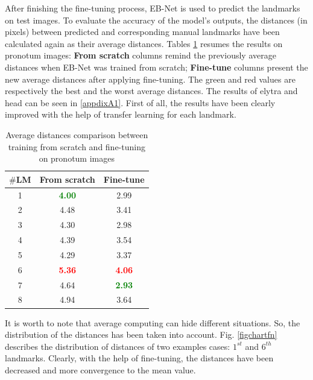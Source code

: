\documentclass[review]{elsarticle}
\begin{document}
After finishing the fine-tuning process, EB-Net is used to predict the landmarks on test images. To evaluate the accuracy of the model's outputs, the distances (in pixels) between predicted and corresponding manual landmarks have been calculated again as their average distances. Tables \ref{cmppronotum} resumes the results on pronotum images: \textbf{From scratch} columns remind the previously average distances when EB-Net was trained from scratch; \textbf{Fine-tune} columns present the new average distances after applying fine-tuning. The green and red values are respectively the best and the worst average distances. The results of elytra and head can be seen in \ref{appdixA1}. First of all, the results have been clearly improved with the help of transfer learning for each landmark.
\begin{table}[htbp]
	\centering
	\begin{tabular}{|c|c|c|}
		\hline
		\textbf{$\#$LM} & \textbf{From scratch} & \textbf{Fine-tune} \\ \hline
		1 & \textcolor{green}{\textbf{4.00 }}& 2.99\\ \hline
		2 & 4.48 & 3.41  \\ \hline
		3 & 4.30  & 2.98 \\ \hline
		4 & 4.39  & 3.54\\ \hline
		5 & 4.29  & 3.37 \\ \hline
		6 & \textcolor{red}{\textbf{5.36}}  & \textcolor{red}{\textbf{4.06}} \\ \hline
		7 & 4.64  & \textcolor{green}{\textbf{2.93}} \\ \hline
		8 & 4.94  & 3.64 \\ \hline
	\end{tabular}
	\caption{Average distances comparison between training from scratch and fine-tuning on pronotum images}
	\label{cmppronotum}
\end{table}

It is worth to note that average computing can hide different situations. So, the distribution of the distances has been taken into account. Fig. \ref{figchartfn} describes the distribution of distances of two examples cases: $1^{st}$ and $6^{th}$ landmarks. Clearly, with the help of fine-tuning, the distances have been decreased and more convergence to the mean value.
\end{document}

